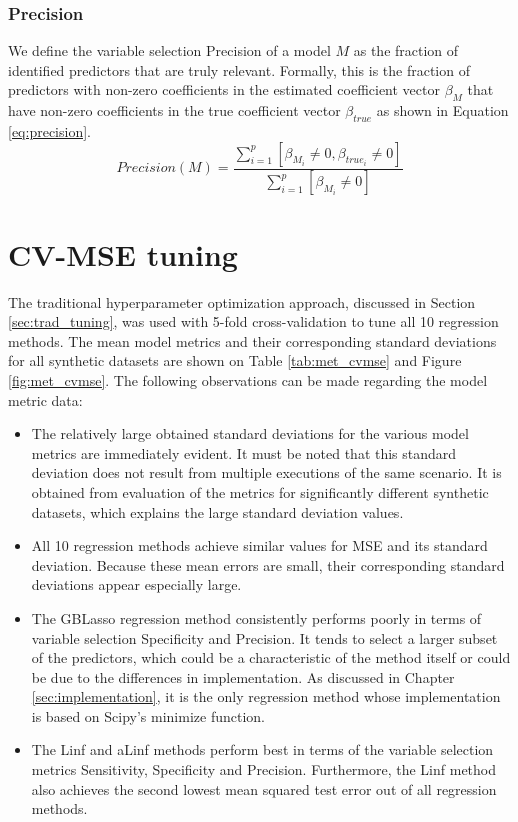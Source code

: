\subsubsection{Precision}
We define the variable selection Precision of a model $M$ as the fraction of identified predictors that are truly relevant. Formally, this is the fraction of predictors with non-zero coefficients in the estimated coefficient vector $\beta_M$ that have non-zero coefficients in the true coefficient vector $\beta_{true}$ as shown in Equation \ref{eq:precision}. 
\begin{equation} \label{eq:precision}
Precision(M) = \frac{\sum_{i=1}^{p}[\beta_{M_i} \ne 0, \beta_{true_i} \ne 0]}{\sum_{i=1}^{p}[\beta_{M_i} \ne 0]}
\end{equation}


\section{CV-MSE tuning} \label{sec:disc_cvmse_tun}
The traditional hyperparameter optimization approach, discussed in Section \ref{sec:trad_tuning}, was used with 5-fold cross-validation to tune all 10 regression methods. The mean model metrics and their corresponding standard deviations for all synthetic datasets are shown on Table \ref{tab:met_cvmse} and Figure \ref{fig:met_cvmse}. The following observations can be made regarding the model metric data:

\begin{itemize}
	\item The relatively large obtained standard deviations for the various model metrics are immediately evident. It must be noted that this standard deviation does not result from multiple executions of the same scenario. It is obtained from evaluation of the metrics for significantly different synthetic datasets, which explains the large standard deviation values. 
	\item All 10 regression methods achieve similar values for MSE and its standard deviation. Because these mean  errors are small, their corresponding standard deviations appear especially large. 
	\item The GBLasso regression method consistently performs poorly in terms of variable selection Specificity and Precision. It tends to select a larger subset of the predictors, which could be a characteristic of the method itself or could be due to the differences in implementation. As discussed in Chapter \ref{sec:implementation}, it is the only regression method whose implementation is based on Scipy's minimize function.
	\item The Linf and aLinf methods perform best in terms of the variable selection metrics Sensitivity, Specificity and Precision. Furthermore, the Linf method also achieves the second lowest mean squared test error out of all regression methods.
\end{itemize}

